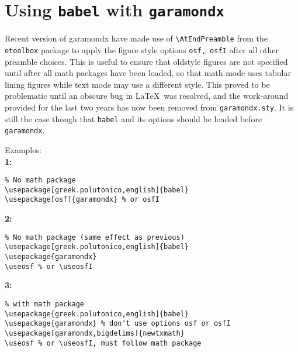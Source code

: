 \documentclass[11pt]{article}
\begin{document}
\section{Using \texttt{babel} with \texttt{garamondx}\label{sec:opt}}
Recent version of \textsf{garamondx} have made use of \verb|\AtEndPreamble| from the {\tt etoolbox} package to apply the  figure style options {\tt osf, osfI} after all other preamble choices. This is useful to ensure that oldstyle figures are not specified until after all math packages have been loaded, so that math mode uses tabular lining figures while text mode may use a different style. This proved to be problematic until an obscure bug in \LaTeX\ was resolved, and the work-around provided for the last two years has now been removed from {\tt garamondx.sty}.  It is still the case though that {\tt babel} and its options should be loaded before {\tt garamondx}.
\iffalse
It now appears that this macro can be incompatible with {\tt babel} in some cases where the language choice involves an encoding other than T$1$. If you find when using {\tt babel} that you get errors about corruption of your NFSS tables or find that some \texttt{babel} features do not work as expected, you may need to use the {\tt babel} option to {\tt garamondx} and possibly rearrange the order of some macros. First of all, you should load \texttt{babel} before {\tt garamondx}. When {\tt garamondx.sty} tuns, it sets a flag if it detects that {\tt babel} has already been  loaded, and modifies some commands. This flag may also be set by the option {\tt babel}. If for some reason you must load {\tt babel} after {\tt garamondx}, specify the {\tt babel} option when loading {\tt garamondx}, but be aware that {\tt babel} may not work as expected in this case. 
\fi

Examples:\\
{\bf 1:}\\[-20pt]
\begin{verbatim}
% No math package
\usepackage[greek.polutonico,english]{babel}
\usepackage[osf]{garamondx} % or osfI
\end{verbatim}
{\bf 2:}\\[-20pt]
\begin{verbatim}
% No math package (same effect as previous)
\usepackage[greek.polutonico,english]{babel}
\usepackage{garamondx} 
\useosf % or \useosfI
\end{verbatim}
{\bf 3:}\\[-20pt]
\begin{verbatim}
% with math package
\usepackage{greek.polutonico,english]{babel}
\usepackage{garamondx} % don't use options osf or osfI
\usepackage[garamondx,bigdelims]{newtxmath}
\useosf % or \useosfI, must follow math package
\end{verbatim}
\end{document}
